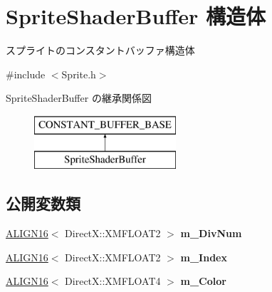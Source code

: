 \hypertarget{struct_d3_d11_1_1_graphic_1_1_sprite_shader_buffer}{}\section{Sprite\+Shader\+Buffer 構造体}
\label{struct_d3_d11_1_1_graphic_1_1_sprite_shader_buffer}


スプライトのコンスタントバッファ構造体  




{\ttfamily \#include $<$Sprite.\+h$>$}

Sprite\+Shader\+Buffer の継承関係図\begin{figure}[H]
\begin{center}
\leavevmode
\includegraphics[height=2.000000cm]{struct_d3_d11_1_1_graphic_1_1_sprite_shader_buffer}
\end{center}
\end{figure}
\subsection*{公開変数類}
\begin{DoxyCompactItemize}
\item 
\hyperlink{struct_d3_d11_1_1_graphic_1_1_c_o_n_s_t_a_n_t___b_u_f_f_e_r___b_a_s_e_a3443b7ba28a2ff538b5d9f5f82c02b55}{A\+L\+I\+G\+N16}$<$ Direct\+X\+::\+X\+M\+F\+L\+O\+A\+T2 $>$ {\bfseries m\+\_\+\+Div\+Num}\hypertarget{struct_d3_d11_1_1_graphic_1_1_sprite_shader_buffer_ac9aa37de1e2292c08d763df5e3255d68}{}\label{struct_d3_d11_1_1_graphic_1_1_sprite_shader_buffer_ac9aa37de1e2292c08d763df5e3255d68}

\item 
\hyperlink{struct_d3_d11_1_1_graphic_1_1_c_o_n_s_t_a_n_t___b_u_f_f_e_r___b_a_s_e_a3443b7ba28a2ff538b5d9f5f82c02b55}{A\+L\+I\+G\+N16}$<$ Direct\+X\+::\+X\+M\+F\+L\+O\+A\+T2 $>$ {\bfseries m\+\_\+\+Index}\hypertarget{struct_d3_d11_1_1_graphic_1_1_sprite_shader_buffer_a9b891fd9718c340c005376426d8f3ed0}{}\label{struct_d3_d11_1_1_graphic_1_1_sprite_shader_buffer_a9b891fd9718c340c005376426d8f3ed0}

\item 
\hyperlink{struct_d3_d11_1_1_graphic_1_1_c_o_n_s_t_a_n_t___b_u_f_f_e_r___b_a_s_e_a3443b7ba28a2ff538b5d9f5f82c02b55}{A\+L\+I\+G\+N16}$<$ Direct\+X\+::\+X\+M\+F\+L\+O\+A\+T4 $>$ {\bfseries m\+\_\+\+Color}\hypertarget{struct_d3_d11_1_1_graphic_1_1_sprite_shader_buffer_a90918a276359954b761522f699d958c5}{}\label{struct_d3_d11_1_1_graphic_1_1_sprite_shader_buffer_a90918a276359954b761522f699d958c5}

\end{DoxyCompactItemize}
